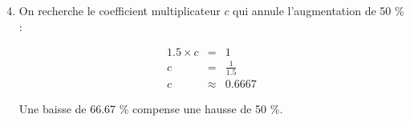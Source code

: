 \documentclass[xcolor={dvipsnames}]{beamer}
\begin{document}
\begin{frame}
\begin{enumerate}[1.]
	\setcounter{enumi}{3}
	\item 
	
	On recherche le coefficient multiplicateur $c$ qui annule l'augmentation de 50 \% :
	
	\begin{eqnarray*}
		\num{1.5} \times c &=& 1 \\
		c &=& \frac{1}{\num{1.5}} \\
		c &\approx& \num{0.6667}
	\end{eqnarray*}  
	
	Une baisse de \num{66.67} \% compense une hausse de 50 \%. 
	
\end{enumerate}
\end{frame}
\end{document}
